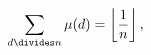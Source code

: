 \[\sum_{d\divides n}\mathop{\mu\/}\nolimits\!\left(d\right)=\left\lfloor\frac{1}%
{n}\right\rfloor,\]